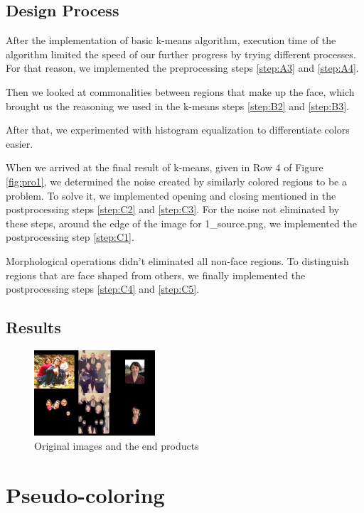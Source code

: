 \documentclass[conference]{IEEEtran}
\begin{document}
\subsection{Design Process}
After the implementation of basic k-means algorithm, execution time of the algorithm limited the speed of our further progress by trying different processes. For that reason, we implemented the preprocessing steps \ref{step:A3} and \ref{step:A4}.

Then we looked at commonalities between regions that make up the face, which brought us the reasoning we used in the k-means steps \ref{step:B2} and \ref{step:B3}.

After that, we experimented with histogram equalization to differentiate colors easier.

When we arrived at the final result of k-means, given in Row 4 of Figure \ref{fig:pro1}, we determined the noise created by similarly colored regions to be a problem. To solve it, we implemented opening and closing mentioned in the postprocessing steps \ref{step:C2} and \ref{step:C3}. For the noise not eliminated by these steps, around the edge of the image for 1\_source.png, we implemented the postprocessing step \ref{step:C1}.

Morphological operations didn't eliminated all non-face regions. To distinguish regions that are face shaped from others, we finally implemented the postprocessing steps \ref{step:C4} and \ref{step:C5}.
\subsection{Results}
\begin{figure}[h]
    \centering
    \includegraphics[width=0.4\textwidth]{resources/End Result Compare.jpeg}
    \caption{Original images and the end products}
    \label{fig:end}
\end{figure}
\section{Pseudo-coloring}
\end{document}
